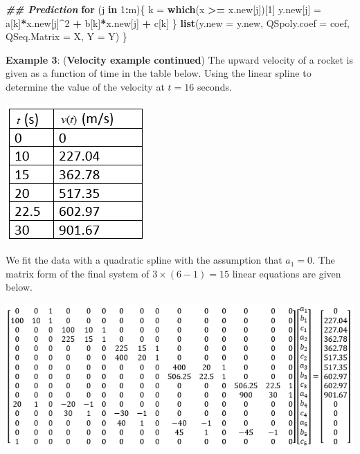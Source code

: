\documentclass[
]{book}
\newenvironment{Shaded}{\begin{snugshade}}{\end{snugshade}}
\newcommand{\AttributeTok}[1]{\textcolor[rgb]{0.13,0.29,0.53}{#1}}
\newcommand{\ControlFlowTok}[1]{\textcolor[rgb]{0.13,0.29,0.53}{\textbf{#1}}}
\newcommand{\DecValTok}[1]{\textcolor[rgb]{0.00,0.00,0.81}{#1}}
\newcommand{\DocumentationTok}[1]{\textcolor[rgb]{0.56,0.35,0.01}{\textbf{\textit{#1}}}}
\newcommand{\FunctionTok}[1]{\textcolor[rgb]{0.13,0.29,0.53}{\textbf{#1}}}
\newcommand{\NormalTok}[1]{#1}
\newcommand{\OtherTok}[1]{\textcolor[rgb]{0.56,0.35,0.01}{#1}}
\newcommand{\SpecialCharTok}[1]{\textcolor[rgb]{0.81,0.36,0.00}{\textbf{#1}}}
\begin{document}
\begin{Shaded}
\begin{Highlighting}[]
     \DocumentationTok{\#\# Prediction}
     \ControlFlowTok{for}\NormalTok{ (j }\ControlFlowTok{in} \DecValTok{1}\SpecialCharTok{:}\NormalTok{m)\{}
\NormalTok{       k }\OtherTok{=} \FunctionTok{which}\NormalTok{(x }\SpecialCharTok{\textgreater{}=}\NormalTok{ x.new[j])[}\DecValTok{1}\NormalTok{]}
\NormalTok{       y.new[j] }\OtherTok{=}\NormalTok{ a[k]}\SpecialCharTok{*}\NormalTok{x.new[j]}\SpecialCharTok{\^{}}\DecValTok{2} \SpecialCharTok{+}\NormalTok{ b[k]}\SpecialCharTok{*}\NormalTok{x.new[j] }\SpecialCharTok{+}\NormalTok{ c[k]}
\NormalTok{     \}}
    \FunctionTok{list}\NormalTok{(}\AttributeTok{y.new =}\NormalTok{ y.new, }\AttributeTok{QSpoly.coef =}\NormalTok{ coef, }\AttributeTok{QSeq.Matrix =}\NormalTok{ X, }\AttributeTok{Y =}\NormalTok{ Y) }
\NormalTok{\}}
\end{Highlighting}
\end{Shaded}

\hfill\break

\textbf{Example 3}: (\textbf{Velocity example continued}) The upward velocity of a rocket is given as a function of time in the table below. Using the linear spline to determine the value of the velocity at \(t = 16\) seconds.

\begin{center}\includegraphics[width=0.2\linewidth]{img10/05-VelocityData} \end{center}

We fit the data with a quadratic spline with the assumption that \(a_1 = 0\). The matrix form of the final system of \(3\times (6-1) =15\) linear equations are given below.

\begin{center}\includegraphics[width=0.75\linewidth]{img10/10-systemEq4QuadraticSpline} \end{center}
\end{document}
